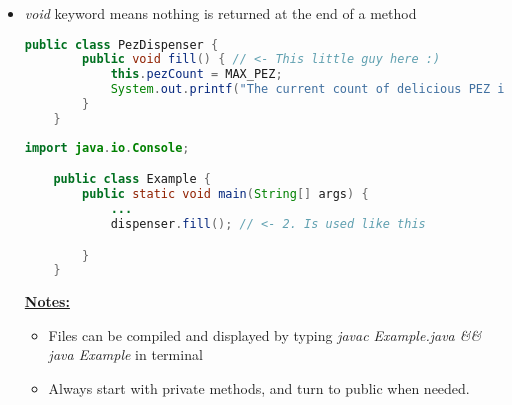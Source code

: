 \documentclass[12pt]{article}
\begin{document}
\bigskip

\begin{itemize}
    \item \textit{void} keyword means nothing is returned at the end of a method

    \begin{lstlisting}[language=Java,caption={lesson\_3/PezDispenser.java}]
    public class PezDispenser {
        public void fill() { // <- This little guy here :)
            this.pezCount = MAX_PEZ;
            System.out.printf("The current count of delicious PEZ is %d\n", this.pezCount);
        }
    }
    \end{lstlisting}

    \begin{lstlisting}[language=Java,caption={lesson\_3/Example.java}]
    import java.io.Console;

    public class Example {
        public static void main(String[] args) {
            ...
            dispenser.fill(); // <- 2. Is used like this

        }
    }
    \end{lstlisting}

    \bigskip

    \underline{\textbf{Notes:}}

    \bigskip

    \begin{itemize}
        \item Files can be compiled and displayed by typing \textit{javac Example.java \&\& java Example}
        in terminal
        \item Always start with private methods, and turn to public when needed.
    \end{itemize}
\end{itemize}
\end{document}
